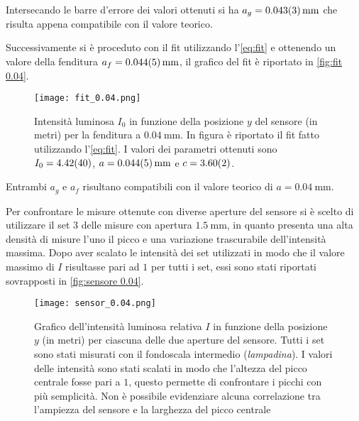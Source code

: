 \documentclass[../main.tex]{subfiles}
\begin{document}
Intersecando le barre d'errore dei valori ottenuti si ha $a_g = \qty{0.043+-0.003}{\mm}$ che risulta appena compatibile con il valore teorico.



\newpage

Successivamente si è proceduto con il fit utilizzando l'\autoref{eq:fit} e ottenendo un valore della fenditura $a_f = \qty{0.044+-0.005}{\mm}$, il grafico del fit è riportato in \autoref{fig:fit 0.04}.

\begin{figure}[ht!]
    \centering
    \texttt{[image: fit\_0.04.png]}
    \caption{Intensità luminosa $I_{0}$ in funzione della posizione $y$ del sensore (in metri) per la fenditura a $\qty{0.04}{\mm}$. In figura è riportato il fit fatto utilizzando l'\autoref{eq:fit}. I valori dei parametri ottenuti sono $I_{0} = \num{4.42+-0.4}$, $a = \qty{0.044+-0.005}{\mm}$ e $c = \num{3.60+-0.02}$. }
    \label{fig:fit 0.04}
\end{figure}

Entrambi $a_g$ e $a_f$ risultano compatibili con il valore teorico di $a = \qty{0.04}{\mm}$.

\newpage

Per confrontare le misure ottenute con diverse aperture del sensore si è scelto di utilizzare il set $3$ delle misure con apertura $\qty{1.5}{\mm}$, in quanto presenta una alta densità di misure l'uno il picco e una variazione trascurabile dell'intensità massima. Dopo aver scalato le intensità dei set utilizzati in modo che il valore massimo di $I$ risultasse pari ad $1$ per tutti i set, essi sono stati riportati sovrapposti in \autoref{fig:sensore 0.04}.

\begin{figure}[ht!]
    \centering
    \texttt{[image: sensor\_0.04.png]}
    \caption{Grafico dell'intensità luminosa relativa $I$ in funzione della posizione $y$ (in metri) per ciascuna delle due aperture del sensore.
    Tutti i set sono stati misurati con il fondoscala intermedio (\textit{lampadina}). I valori delle intensità sono stati scalati in modo che l'altezza del picco centrale fosse pari a $1$, questo permette di confrontare i picchi con più semplicità.
    Non è possibile evidenziare alcuna correlazione tra l'ampiezza del sensore e la larghezza del picco centrale} %
    \label{fig:sensore 0.04}
\end{figure}
\end{document}
